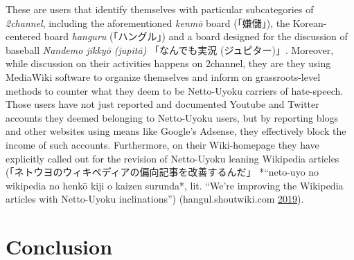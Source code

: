 \documentclass[10pt,british,A4paper,,openany]{memoir}
\begin{document}
These are users that identify themselves with particular subcategories
of \emph{2channel}, including the aforementioned \emph{kenmō} board
(「嫌儲」), the Korean-centered board \emph{hanguru} (「ハングル」) and
a board designed for the discussion of baseball \emph{Nandemo jikkyō
(jupitā)} 「なんでも実況 (ジュピター)」. Moreover, while discussion on
their activities happens on 2channel, they are they using MediaWiki
software to organize themselves and inform on grassroots-level methods
to counter what they deem to be Netto-Uyoku carriers of hate-speech.
Those users have not just reported and documented Youtube and Twitter
accounts they deemed belonging to Netto-Uyoku users, but by reporting
blogs and other websites using means like Google's Adsense, they
effectively block the income of such accounts. Furthermore, on their
Wiki-homepage they have explicitly called out for the revision of
Netto-Uyoku leaning Wikipedia articles
(「ネトウヨのウィキペディアの偏向記事を改善するんだ」 *``neto-uyo no
wikipedia no henkō kiji o kaizen surunda*, lit. ``We're improving the
Wikipedia articles with Netto-Uyoku inclinations'')
(hangul.shoutwiki.com
\protect\hyperlink{ref-hangul.shoutwiki.com_wikipedia_2019}{2019}).

\section{Conclusion}\label{conclusion-2}
\end{document}
